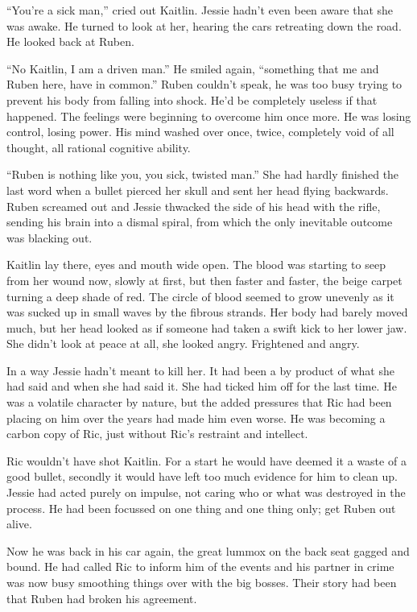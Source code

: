 ``You're a sick man,'' cried out Kaitlin.  Jessie hadn't even been aware that she was awake.  He turned to look at her, hearing the cars retreating down the road.  He looked back at Ruben.

``No Kaitlin, I am a driven man.''  He smiled again, ``something that me and Ruben here, have in common.''  Ruben couldn't speak, he was too busy trying to prevent his body from falling into shock.  He'd be completely useless if that happened.  The feelings were beginning to overcome him once more.  He was losing control, losing power.  His mind washed over once, twice, completely void of all thought, all rational cognitive ability.  

``Ruben is nothing like you, you sick, twisted man.''  She had hardly finished the last word when a bullet pierced her skull and sent her head flying backwards.  Ruben screamed out and Jessie thwacked the side of his head with the rifle, sending his brain into a dismal spiral, from which the only inevitable outcome was blacking out.  



\thoughtbreak



Kaitlin lay there, eyes and mouth wide open.  The blood was starting to seep from her wound now, slowly at first, but then faster and faster, the beige carpet turning a deep shade of red.  The circle of blood seemed to grow unevenly as it was sucked up in small waves by the fibrous strands.  Her body had barely moved much, but her head looked as if someone had taken a swift kick to her lower jaw.  She didn't look at peace at all, she looked angry.  Frightened and angry.

In a way Jessie hadn't meant to kill her.  It had been a by product of what she had said and when she had said it.  She had ticked him off for the last time.  He was a volatile character by nature, but the added pressures that Ric had been placing on him over the years had made him even worse.  He was becoming a carbon copy of Ric, just without Ric's restraint and intellect.

Ric wouldn't have shot Kaitlin.  For a start he would have deemed it a waste of a good bullet, secondly it would have left too much evidence for him to clean up.  Jessie had acted purely on impulse, not caring who or what was destroyed in the process.  He had been focussed on one thing and one thing only; get Ruben out alive.  

Now he was back in his car again, the great lummox on the back seat gagged and bound.  He had called Ric to inform him of the events and his partner in crime was now busy smoothing things over with the big bosses.  Their story had been that Ruben had broken his  agreement.  

